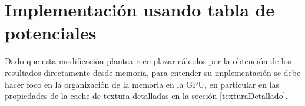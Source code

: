 
\section{Implementación usando tabla de potenciales}

% 



Dado que esta modificación plantea reemplazar cálculos por la obtención de los resultados directamente desde memoria, 
para entender su implementación se debe hacer foco en la organización de la memoria en la GPU, en particular en las propiedades de la cache de textura detalladas en la sección \ref{texturaDetallado}.





